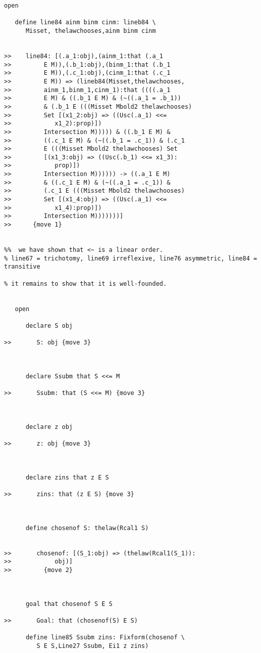 \documentclass[12pt]{article}
\begin{document}
\begin{verbatim}
open

   define line84 ainm binm cinm: lineb84 \
      Misset, thelawchooses,ainm binm cinm


>>    line84: [(.a_1:obj),(ainm_1:that (.a_1
>>         E M)),(.b_1:obj),(binm_1:that (.b_1
>>         E M)),(.c_1:obj),(cinm_1:that (.c_1
>>         E M)) => (lineb84(Misset,thelawchooses,
>>         ainm_1,binm_1,cinm_1):that ((((.a_1
>>         E M) & ((.b_1 E M) & (~((.a_1 = .b_1))
>>         & (.b_1 E (((Misset Mbold2 thelawchooses)
>>         Set [(x1_2:obj) => ((Usc(.a_1) <<=
>>            x1_2):prop)])
>>         Intersection M))))) & ((.b_1 E M) &
>>         ((.c_1 E M) & (~((.b_1 = .c_1)) & (.c_1
>>         E (((Misset Mbold2 thelawchooses) Set
>>         [(x1_3:obj) => ((Usc(.b_1) <<= x1_3):
>>            prop)])
>>         Intersection M)))))) -> ((.a_1 E M)
>>         & ((.c_1 E M) & (~((.a_1 = .c_1)) &
>>         (.c_1 E (((Misset Mbold2 thelawchooses)
>>         Set [(x1_4:obj) => ((Usc(.a_1) <<=
>>            x1_4):prop)])
>>         Intersection M)))))))]
>>      {move 1}


%%  we have shown that <~ is a linear order. 
% line67 = trichotomy, line69 irreflexive, line76 asymmetric, line84 = transitive

% it remains to show that it is well-founded.


   open

      declare S obj

>>       S: obj {move 3}



      declare Ssubm that S <<= M

>>       Ssubm: that (S <<= M) {move 3}



      declare z obj

>>       z: obj {move 3}



      declare zins that z E S

>>       zins: that (z E S) {move 3}



      define chosenof S: thelaw(Rcal1 S)


>>       chosenof: [(S_1:obj) => (thelaw(Rcal1(S_1)):
>>            obj)]
>>         {move 2}



      goal that chosenof S E S

>>       Goal: that (chosenof(S) E S)

      define line85 Ssubm zins: Fixform(chosenof \
         S E S,Line27 Ssubm, Ei1 z zins)


\end{verbatim}
\end{document}
